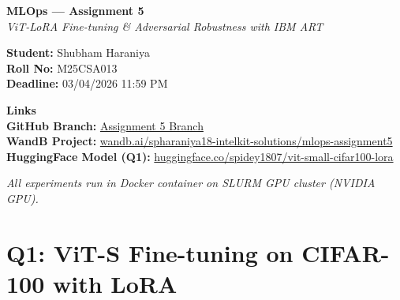 \documentclass[12pt,a4paper]{article}
\begin{document}
\begin{titlepage}
    \centering
    \vspace*{1cm}
    {\LARGE \textbf{MLOps — Assignment 5}}\\[0.5cm]
    {\large \textit{ViT-LoRA Fine-tuning \& Adversarial Robustness with IBM ART}}\\[1.5cm]

    \begin{tcolorbox}[colback=lightgray, colframe=iitblue, width=0.8\textwidth]
        \centering
        \textbf{Student:} Shubham Haraniya\\
        \textbf{Roll No:} M25CSA013\\
        \textbf{Deadline:} 03/04/2026 11:59 PM
    \end{tcolorbox}

    \vspace{1cm}

    \begin{tcolorbox}[colback=lightgray, colframe=darkgreen, width=0.9\textwidth]
        \centering
        \textbf{\color{darkgreen}Links}\\[0.3cm]
        \textbf{GitHub Branch:} \href{https://github.com}{Assignment 5 Branch}\\[0.2cm]
        \textbf{WandB Project:} \href{https://wandb.ai/spharaniya18-intelkit-solutions/mlops-assignment5}{wandb.ai/spharaniya18-intelkit-solutions/mlops-assignment5}\\[0.2cm]
        \textbf{HuggingFace Model (Q1):} \href{https://huggingface.co/spidey1807/vit-small-cifar100-lora}{huggingface.co/spidey1807/vit-small-cifar100-lora}
    \end{tcolorbox}

    \vfill
    {\small \textit{All experiments run in Docker container on SLURM GPU cluster (NVIDIA GPU).}}
\end{titlepage}

\tableofcontents
\newpage

\section{Q1: ViT-S Fine-tuning on CIFAR-100 with LoRA}
\end{document}

